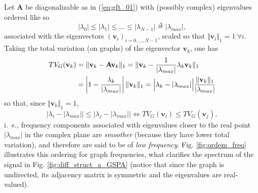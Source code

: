 Let $ \mathbf{A} $ be diagonalizable as in (\ref{eq:gft_01}) with (possibly complex) eigenvalues ordered like so
\begin{equation}
\label{eq:eig_order}
|\lambda_0| \leq |\lambda_1| \leq \dots \leq |\lambda_{N-1}| \overset{\Delta}{=} |\lambda_{max}|,
\end{equation}
associated with the eigenvectors $ (\mathbf{v}_i)_{i=0,\dots,N-1} $, scaled so that $ \Vert \mathbf{v}_i \Vert_1 = 1  \ \forall i$. Taking the total variation (on graphs) of the eigenvector $ \mathbf{v}_k $, one has
\begin{align*}
TV_G(\mathbf{v}_k) &= \Vert \mathbf{v}_k - \mathbf{A} \mathbf{v}_k \Vert_1  = \Vert\mathbf{v}_k - \frac{1}{|\lambda_{max}|} \lambda_k \mathbf{v}_k \Vert_1 \notag \\
&= \left|1 - \frac{\lambda_k}{|\lambda_{max}|}\right| \Vert \mathbf{v}_k \Vert_1 = \Big| \lambda_k - |\lambda_{max}| \Big| \frac{\Vert \mathbf{v}_k \Vert_{1}}{|\lambda_{max}|}
\end{align*}
so that, since $ \Vert \mathbf{v}_k \Vert_1 = 1 $,
\begin{equation}
\label{eq:TV_ordering}
\Big| \! \lambda_i  - \! |\lambda_{max}|\Big| \! \leq \! \Big|  \lambda_j  - \! |\lambda_{max}|\Big| \! \! \iff \! \! TV_G(\mathbf{v}_i) \leq TV_G(\mathbf{v}_j),
\end{equation}
i.~e., frequency components associated with eigenvalues closer to the real point $ |\lambda_{max}| $ in the complex plane are \emph{smoother} (because they have lower total variation), and therefore are said to be of \emph{low frequency}. Fig. \ref{fig:ordem_freq} illustrates this ordering for graph frequencies, what clarifies the spectrum of the signal in Fig. \ref{fig:diff_struct_a_GSPA} (notice that since the graph is undirected, its adjacency matrix is symmetric and the eigenvalues are real-valued).


